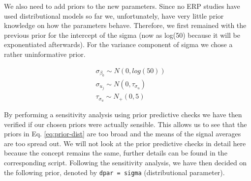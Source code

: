 \documentclass[
  doc,12pt,floatsintext]{apa7}
\begin{document}
We also need to add priors to the new parameters. Since no ERP studies have used distributional models so far we, unfortunately, have very little prior knowledge on how the parameters behave. Therefore, we first remained with the previous prior for the intercept of the sigma (now as log(50) because it will be exponentiated afterwards). For the variance component of sigma we chose a rather uninformative prior.

\begin{equation}
\begin{split}
& \sigma_{\beta_0} \sim N(0, log(50)) \\
& \sigma_{u_j} \sim N(0, \tau_{\sigma_u}) \\
& \tau_{\sigma_u} \sim N_{+}(0,5)
\end{split}
\label{eq:prior-dist}
\end{equation}

By performing a sensitivity analysis using prior predictive checks we have then verified if our chosen priors were actually sensible. This allows us to see that the priors in Eq. \eqref{eq:prior-dist} are too broad and the means of the signal averages are too spread out. We will not look at the prior predictive checks in detail here because the concept remains the same, further details can be found in the corresponding script. Following the sensitivity analysis, we have then decided on the following prior, denoted by \texttt{dpar\ =\ sigma} (distributional parameter).
\end{document}
